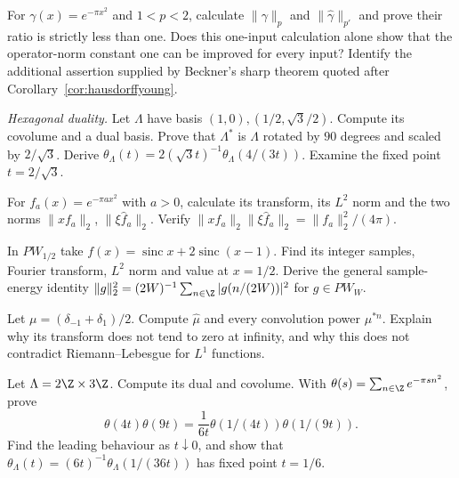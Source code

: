 \begin{exercise}[$\star$]\label{ex:hysharp}
For $\gamma(x)=e^{-\pi x^2}$ and $1<p<2$, calculate $\|\gamma\|_p$ and $\|\hat\gamma\|_{p'}$ and prove their ratio is strictly less than one. Does this one-input calculation alone show that the operator-norm constant one can be improved for every input? Identify the additional assertion supplied by Beckner's sharp theorem quoted after Corollary~\ref{cor:hausdorffyoung}.
\end{exercise}
\begin{exercise}[$\star\star$]\label{ex:hexlattice}
\emph{Hexagonal duality.} Let $\Lambda$ have basis $(1,0),(1/2,\sqrt3/2)$. Compute its covolume and a dual basis. Prove that $\Lambda^*$ is $\Lambda$ rotated by $90$ degrees and scaled by $2/\sqrt3$. Derive $\theta_\Lambda(t)=2(\sqrt3t)^{-1}\theta_\Lambda(4/(3t))$. Examine the fixed point $t=2/\sqrt3$.
\end{exercise}

\begin{exercise}[$\star\star$]\label{ex:v8c10a}
For $f_a(x)=e^{-\pi ax^2}$ with $a>0$, calculate its transform, its $L^2$ norm and the two norms $\|xf_a\|_2$, $\|\xi\hat f_a\|_2$. Verify $\|xf_a\|_2\|\xi\hat f_a\|_2=\|f_a\|_2^2/(4\pi)$.
\end{exercise}
\begin{exercise}[$\star$]\label{ex:v8c10b}
In $PW_{1/2}$ take $f(x)=\operatorname{sinc}x+2\operatorname{sinc}(x-1)$. Find its integer samples, Fourier transform, $L^2$ norm and value at $x=1/2$. Derive the general sample-energy identity $\|g\|_2^2=(2W)^{-1}\sum_{n\in\Z}|g(n/(2W))|^2$ for $g\in PW_W$.
\end{exercise}
\begin{exercise}[$\star\star$]\label{ex:v8c10c}
Let $\mu=(\delta_{-1}+\delta_1)/2$. Compute $\hat\mu$ and every convolution power $\mu^{*n}$. Explain why its transform does not tend to zero at infinity, and why this does not contradict Riemann--Lebesgue for $L^1$ functions.
\end{exercise}
\begin{exercise}[$\star\star$]\label{ex:v8c10d}
Let $\Lambda=2\Z\times3\Z$. Compute its dual and covolume. With $\theta(s)=\sum_{n\in\Z}e^{-\pi sn^2}$, prove
\[
\theta(4t)\theta(9t)=\frac1{6t}\theta(1/(4t))\theta(1/(9t)).
\]
Find the leading behaviour as $t\downarrow0$, and show that $\theta_\Lambda(t)=(6t)^{-1}\theta_\Lambda(1/(36t))$ has fixed point $t=1/6$.
\end{exercise}


